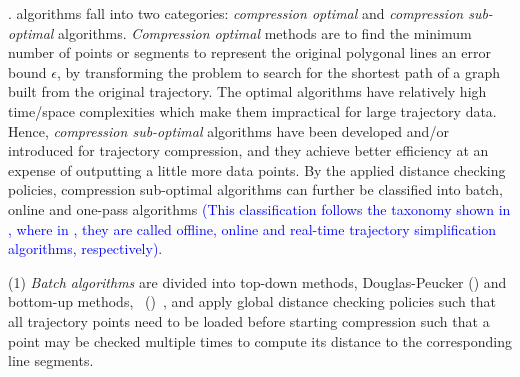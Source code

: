 %


. \lsa algorithms fall into two categories: \textit{compression optimal} and \textit{compression sub-optimal} algorithms.
\textit{Compression optimal} methods \cite{Imai:Optimal,Chan:Optimal} are to find the minimum number of points or segments to represent the original polygonal lines \wrt an error bound $\epsilon$, by transforming the problem to search for the shortest path of a graph built from the original trajectory.
The optimal \lsa algorithms have relatively high time/space complexities which make them impractical for large trajectory data.
Hence, \textit{compression sub-optimal} algorithms have been developed and/or introduced for trajectory compression, and they achieve better efficiency at an expense of outputting a little more data points. By the applied distance checking policies, compression sub-optimal algorithms can further be classified into batch, online and one-pass algorithms \textcolor{blue}{(This classification follows the taxonomy shown in \cite{Lange:Tracking, Lin:Operb, Lin:Cised}, where in \cite{Lange:Tracking}, they are called offline, online and real-time trajectory simplification algorithms, respectively)}.

\sstab (1) {\em Batch algorithms} are divided into top-down methods, \eg Douglas-Peucker (\dpa) \cite{Douglas:Peucker,Meratnia:Spatiotemporal} and bottom-up methods, \eg\ \pavlidis (\tpa)~\cite{Pavlidis:Segment}, and apply global distance checking policies such that all trajectory points need to be loaded before starting compression such that a point may be checked multiple times to compute its distance to the corresponding line segments.

